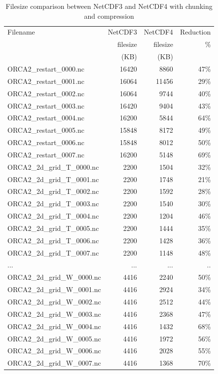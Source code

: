 \begin{table} 	\begin{tabular}{lrrr}
Filename & NetCDF3 & NetCDF4 & Reduction\\
         &filesize & filesize & \% \\
         &(KB)     & (KB)     & \\
ORCA2\_restart\_0000.nc & 16420 & 8860 & 47\%\\
ORCA2\_restart\_0001.nc & 16064 & 11456 & 29\%\\
ORCA2\_restart\_0002.nc & 16064 & 9744 & 40\%\\
ORCA2\_restart\_0003.nc & 16420 & 9404 & 43\%\\
ORCA2\_restart\_0004.nc & 16200 & 5844 & 64\%\\
ORCA2\_restart\_0005.nc & 15848 & 8172 & 49\%\\
ORCA2\_restart\_0006.nc & 15848 & 8012 & 50\%\\
ORCA2\_restart\_0007.nc & 16200 & 5148 & 69\%\\
ORCA2\_2d\_grid\_T\_0000.nc & 2200 & 1504 & 32\%\\
ORCA2\_2d\_grid\_T\_0001.nc & 2200 & 1748 & 21\%\\
ORCA2\_2d\_grid\_T\_0002.nc & 2200 & 1592 & 28\%\\
ORCA2\_2d\_grid\_T\_0003.nc & 2200 & 1540 & 30\%\\
ORCA2\_2d\_grid\_T\_0004.nc & 2200 & 1204 & 46\%\\
ORCA2\_2d\_grid\_T\_0005.nc & 2200 & 1444 & 35\%\\
ORCA2\_2d\_grid\_T\_0006.nc & 2200 & 1428 & 36\%\\
ORCA2\_2d\_grid\_T\_0007.nc & 2200 & 1148 & 48\%\\
             ...            &  ... &  ... & ..  \\
ORCA2\_2d\_grid\_W\_0000.nc & 4416 & 2240 & 50\%\\
ORCA2\_2d\_grid\_W\_0001.nc & 4416 & 2924 & 34\%\\
ORCA2\_2d\_grid\_W\_0002.nc & 4416 & 2512 & 44\%\\
ORCA2\_2d\_grid\_W\_0003.nc & 4416 & 2368 & 47\%\\
ORCA2\_2d\_grid\_W\_0004.nc & 4416 & 1432 & 68\%\\
ORCA2\_2d\_grid\_W\_0005.nc & 4416 & 1972 & 56\%\\
ORCA2\_2d\_grid\_W\_0006.nc & 4416 & 2028 & 55\%\\
ORCA2\_2d\_grid\_W\_0007.nc & 4416 & 1368 & 70\%\\
\end{tabular}
\caption{ 	\label{Tab_NC4} 
Filesize comparison between NetCDF3 and NetCDF4 with chunking and compression}
\end{table}

